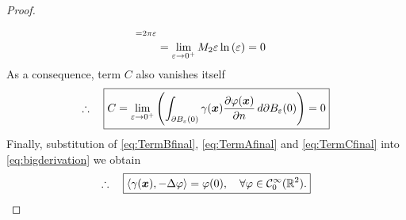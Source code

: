 \documentclass[12pt]{article}
\begin{document}
\begin{proof}
\begin{align}
		_{=2\pi\varepsilon}                                                       \notag \\
		 & = \lim_{\varepsilon\to 0^+} M_{2}
		\varepsilon \ln{(\varepsilon)} = 0
	\end{align}
	As a consequence, term $C$ also vanishes itself
	\begin{align}
		\label{eq:TermCfinal}
		\therefore\quad\boxed{
			C 
			= 
			\lim_{\varepsilon\to 0^+}
			\left(
			\int_{\partial B_\varepsilon(0)} \gamma({\boldsymbol{\mathnormal x}})
			\frac{\partial\varphi({\boldsymbol{\mathnormal x}})}{\partial n}\, d\partial B_{\varepsilon}(0)
			\right)
			= 0
		}
	\end{align}
	Finally, substitution of \eqref{eq:TermBfinal}, \eqref{eq:TermAfinal} and \eqref{eq:TermCfinal}
	into \eqref{eq:bigderivation} we obtain
	\begin{align*}
		\therefore\quad\boxed{
			\langle \gamma({\boldsymbol{\mathnormal x}}),-\Delta \varphi \rangle
			= \varphi(0),
			\quad \forall \varphi \in \mathcal{C}^{\infty}_{0}(\mathbb{R}^2).
		}
	\end{align*}
\end{proof}
\end{document}
